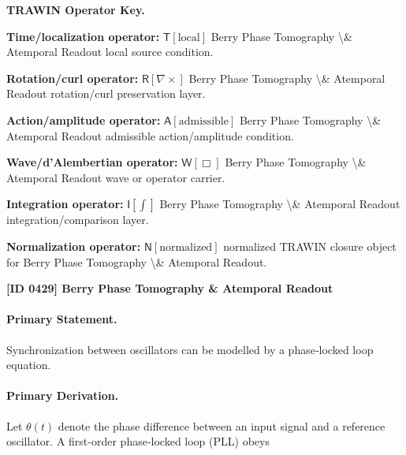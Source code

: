\par\vspace{0.45\baselineskip}
\noindent\begin{minipage}[t]{\linewidth}
\begingroup
\small
\raggedright
\textbf{TRAWIN Operator Key.}\par
\noindent\textbf{Time/localization operator:} $\mathsf{T}\!\left[\mathrm{local}\right]$ Berry Phase Tomography \textbackslash{}\& Atemporal Readout local source condition.\par
\noindent\textbf{Rotation/curl operator:} $\mathsf{R}\!\left[\nabla\times\right]$ Berry Phase Tomography \textbackslash{}\& Atemporal Readout rotation/curl preservation layer.\par
\noindent\textbf{Action/amplitude operator:} $\mathsf{A}\!\left[\mathrm{admissible}\right]$ Berry Phase Tomography \textbackslash{}\& Atemporal Readout admissible action/amplitude condition.\par
\noindent\textbf{Wave/d'Alembertian operator:} $\mathsf{W}\!\left[\Box\right]$ Berry Phase Tomography \textbackslash{}\& Atemporal Readout wave or operator carrier.\par
\noindent\textbf{Integration operator:} $\mathsf{I}\!\left[\int\right]$ Berry Phase Tomography \textbackslash{}\& Atemporal Readout integration/comparison layer.\par
\noindent\textbf{Normalization operator:} $\mathsf{N}\!\left[\mathrm{normalized}\right]$ normalized TRAWIN closure object for Berry Phase Tomography \textbackslash{}\& Atemporal Readout.\par
\endgroup
\end{minipage}

\clearpage
\noindent\textbf{[ID 0429] Berry Phase Tomography \& Atemporal Readout}\par
\vspace{0.35em}
\paragraph{Primary Statement.}

Synchronization between oscillators can be modelled by a phase‑locked loop equation.

\paragraph{Primary Derivation.}

Let $\theta(t)$ denote the phase difference between an input signal and a reference oscillator.  A first‑order phase‑locked loop (PLL) obeys

